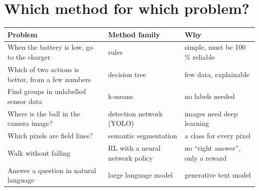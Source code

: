 \section*{Which method for which problem?}
\begin{center}
\renewcommand{\arraystretch}{1.3}
\begin{tabular}{p{5.6cm}p{3.6cm}p{5.0cm}}
\textbf{Problem} & \textbf{Method family} & \textbf{Why}\\ \hline
When the battery is low, go to the charger & rules & simple, must be 100\,\% reliable\\
Which of two actions is better, from a few numbers & decision tree & few data, explainable\\
Find groups in unlabelled sensor data & k-means & no labels needed\\
Where is the ball in the camera image? & detection network (YOLO) & images need deep learning\\
Which pixels are field lines? & semantic segmentation & a class for every pixel\\
Walk without falling & RL with a neural network policy & no ``right answer'', only a reward\\
Answer a question in natural language & large language model & generative text model\\
\end{tabular}
\end{center}

